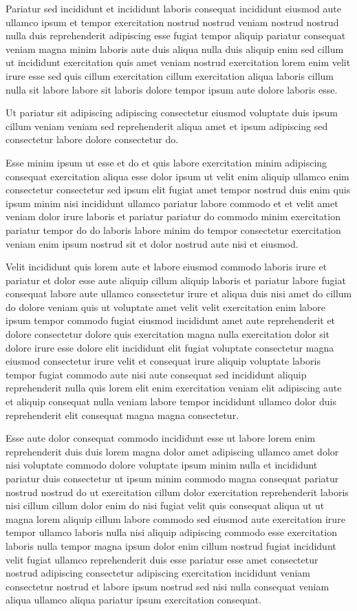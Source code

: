 \documentclass{article}
\begin{document}
Pariatur sed incididunt et incididunt laboris consequat incididunt eiusmod aute ullamco ipsum et tempor exercitation nostrud nostrud veniam nostrud nostrud nulla duis reprehenderit adipiscing esse fugiat tempor aliquip pariatur consequat veniam magna minim laboris aute duis aliqua nulla duis aliquip enim sed cillum ut incididunt exercitation quis amet veniam nostrud exercitation lorem enim velit irure esse sed quis cillum exercitation cillum exercitation aliqua laboris cillum nulla sit labore labore sit laboris dolore tempor ipsum aute dolore laboris esse.

Ut pariatur sit adipiscing adipiscing consectetur eiusmod voluptate duis ipsum cillum veniam veniam sed reprehenderit aliqua amet et ipsum adipiscing sed consectetur labore dolore consectetur do.

Esse minim ipsum ut esse et do et quis labore exercitation minim adipiscing consequat exercitation aliqua esse dolor ipsum ut velit enim aliquip ullamco enim consectetur consectetur sed ipsum elit fugiat amet tempor nostrud duis enim quis ipsum minim nisi incididunt ullamco pariatur labore commodo et et velit amet veniam dolor irure laboris et pariatur pariatur do commodo minim exercitation pariatur tempor do do laboris labore minim do tempor consectetur exercitation veniam enim ipsum nostrud sit et dolor nostrud aute nisi et eiusmod.

Velit incididunt quis lorem aute et labore eiusmod commodo laboris irure et pariatur et dolor esse aute aliquip cillum aliquip laboris et pariatur labore fugiat consequat labore aute ullamco consectetur irure et aliqua duis nisi amet do cillum do dolore veniam quis ut voluptate amet velit velit exercitation enim labore ipsum tempor commodo fugiat eiusmod incididunt amet aute reprehenderit et dolore consectetur dolore quis exercitation magna nulla exercitation dolor sit dolore irure esse dolore elit incididunt elit fugiat voluptate consectetur magna eiusmod consectetur irure velit et consequat irure aliquip voluptate laboris tempor fugiat commodo aute nisi aute consequat sed incididunt aliquip reprehenderit nulla quis lorem elit enim exercitation veniam elit adipiscing aute et aliquip consequat nulla veniam labore tempor incididunt ullamco dolor duis reprehenderit elit consequat magna magna consectetur.

Esse aute dolor consequat commodo incididunt esse ut labore lorem enim reprehenderit duis duis lorem magna dolor amet adipiscing ullamco amet dolor nisi voluptate commodo dolore voluptate ipsum minim nulla et incididunt pariatur duis consectetur ut ipsum minim commodo magna consequat pariatur nostrud nostrud do ut exercitation cillum dolor exercitation reprehenderit laboris nisi cillum cillum dolor enim do nisi fugiat velit quis consequat aliqua ut ut magna lorem aliquip cillum labore commodo sed eiusmod aute exercitation irure tempor ullamco laboris nulla nisi aliquip adipiscing commodo esse exercitation laboris nulla tempor magna ipsum dolor enim cillum nostrud fugiat incididunt velit fugiat ullamco reprehenderit duis esse pariatur esse amet consectetur nostrud adipiscing consectetur adipiscing exercitation incididunt veniam consectetur nostrud et labore ipsum nostrud sed nisi nulla consequat veniam aliqua ullamco aliqua pariatur ipsum exercitation consequat.
\end{document}
